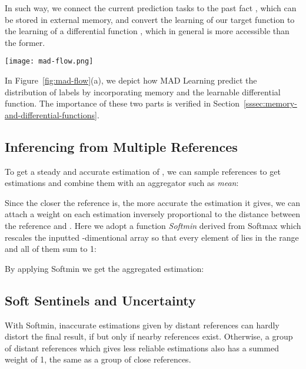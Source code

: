 \documentclass{article}
\begin{document}
In such way, we connect the current prediction tasks  to the past
fact , which can be stored in external memory, and convert the
learning of our target function  to the learning of a
differential function , which in general is more accessible
than the former.

\begin{figure*}
\centering
\texttt{[image: mad-flow.png]}
\caption{
  (a) Memory-Associated Differential Learning
  inferences labels from memorized ones following the first-order Taylor
  series approximation: .
  (b) In binary MAD Learning, when  holds,
   is simplified to be
   since it is the change of 
  after slightly moving  to  with  fixed.
}
\label{fig:mad-flow}
\end{figure*}

In Figure~\ref{fig:mad-flow}(a), we depict how MAD Learning predict the
distribution of labels by incorporating memory and the learnable
differential function. The importance of these two parts is verified
in Section~\ref{sssec:memory-and-differential-functions}.

\hypertarget{inferencing-from-multiple-references}{\subsection{Inferencing from Multiple References}\label{ssec:inferencing-from-multiple-references}}

To get a steady and accurate estimation of , we can sample 
references  to get 
estimations  and
combine them with an aggregator such as \emph{mean}:


Since the closer the reference  is, the more accurate the
estimation  it gives, we can attach a weight on each
estimation inversely proportional to the distance between the reference
 and . Here we adopt a function \emph{Softmin} derived from
Softmax which rescales the inputted -dimentional array  so
that every element of  lies in the range  and all of them
sum to 1:


By applying Softmin we get the aggregated estimation: 

\hypertarget{soft-sentinels-and-uncertainty}{\subsection{Soft Sentinels and Uncertainty}\label{ssec:soft-sentinels-and-uncertainty}}

With Softmin, inaccurate estimations given by distant
references can hardly distort the final result, if but only if
nearby references exist. Otherwise, a group of distant references which
gives less reliable estimations also has a summed weight of 1,
the same as a group of close references.
\end{document}
